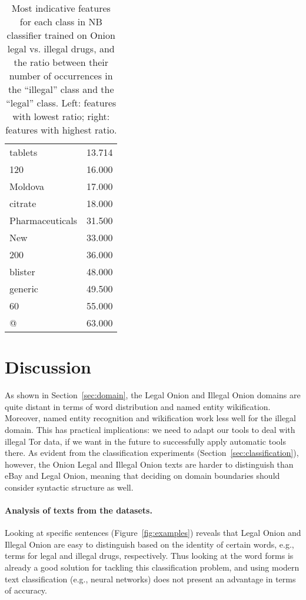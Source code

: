 \documentclass[11pt,a4paper,table]{article}
\begin{document}
\begin{table}[t]
\begin{tabular}{lr}
tablets & 13.714\\
120 & 16.000\\
Moldova & 17.000\\
citrate & 18.000\\
Pharmaceuticals & 31.500\\
New & 33.000\\
200 & 36.000\\
blister & 48.000\\
generic & 49.500\\
60 & 55.000\\
@ & 63.000\\
\end{tabular}
\caption{Most indicative features for each class in NB classifier
trained on Onion legal vs. illegal drugs,
and the ratio between their number of occurrences in the ``illegal''
class and the ``legal'' class.
Left: features with lowest ratio; right: features with highest ratio.
\label{tab:nb_weights}}
\end{table}


\section{Discussion} \label{sec:discussion}

  As shown in Section~\ref{sec:domain}, the Legal Onion and Illegal Onion domains
  are quite distant in terms of word distribution and named entity wikification.
  Moreover, named entity recognition and wikification work less well
  for the illegal domain.
  This has practical implications: we need to adapt our tools to deal with illegal Tor data, if we want in the future to successfully apply automatic tools there.
  As evident from the classification experiments (Section~\ref{sec:classification}), however,
  the Onion Legal and Illegal Onion texts are harder to distinguish than
  eBay and Legal Onion, meaning that deciding on domain boundaries should consider syntactic structure as well.

  \paragraph{Analysis of texts from the datasets.}

    Looking at specific sentences (Figure~\ref{fig:examples})
    reveals that Legal Onion and Illegal Onion are easy to distinguish
    based on the identity of certain words, e.g., terms for legal and illegal drugs,
    respectively.
    Thus looking at the word forms is already a good solution for tackling this
    classification problem,
    and using modern text classification (e.g., neural networks)
    does not present an advantage in
    terms of accuracy.
\end{document}
